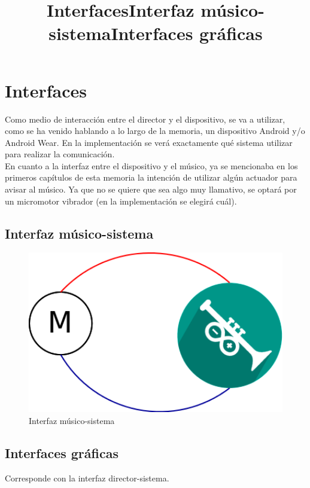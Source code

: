 \section{Interfaces}
\title{Interfaces}

Como medio de interacción entre el director y el dispositivo, se va a utilizar,
como se ha venido hablando a lo largo de la memoria, un dispositivo Android y/o
Android Wear. En la implementación se verá exactamente qué sistema utilizar
para realizar la comunicación.\\

En cuanto a la interfaz entre el dispositivo y el músico, ya se mencionaba en
los primeros capítulos de esta memoria la intención de utilizar algún actuador
para avisar al músico. Ya que no se quiere que sea algo muy llamativo, se optará
por un micromotor vibrador (en la implementación se elegirá cuál).\\


\subsection{Interfaz músico-sistema}
\title{Interfaz músico-sistema}
\begin{figure}[!htb]
\centering
\includegraphics[width=1\textwidth]{./imagenes/motorarduband}
\caption{Interfaz músico-sistema} \label{fig:motorarduband}
\end{figure}

\subsection{Interfaces gráficas}
\title{Interfaces gráficas}

Corresponde con la interfaz director-sistema.\\

